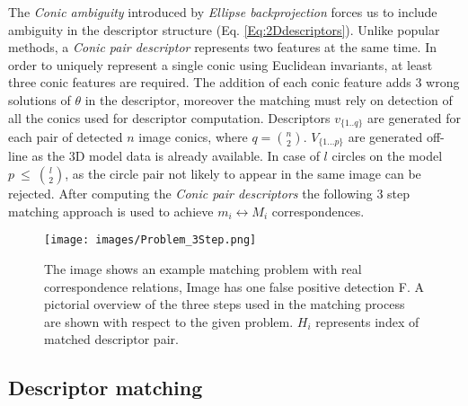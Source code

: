 \documentclass{bmvc2k}
\begin{document}
The \textit{Conic ambiguity} introduced by \textit{Ellipse backprojection} forces us to include ambiguity in the descriptor structure (Eq. \ref{Eq:2Ddescriptors}). 
Unlike popular methods, a \textit{Conic pair descriptor} represents two features at the same time. 
In order to uniquely represent a single conic using Euclidean invariants, at least three conic features are required. 
The addition of each conic feature adds 3 wrong solutions of $ \theta $ in the descriptor, moreover the matching must rely on detection of all the conics used for descriptor computation. 
Descriptors $ v_{\{1..q\}} $ are generated for each pair of detected $ n $ image conics, where $ q = \binom{n}{2} $. 
$ V_{\{1...p\}} $ are generated off-line as the 3D model data is already available.
In case of $ l $ circles on the model $ p~\leq~\binom{l}{2} $, as the circle pair not likely to appear in the same image can be rejected. 
After computing the \textit{Conic pair descriptors} the following 3 step matching approach is used to achieve $ m_i \leftrightarrow M_i $ correspondences. 

\begin{figure}
\centering

\texttt{[image: images/Problem\_3Step.png]}
\caption{ The image shows an example matching problem with real correspondence relations, Image has one false positive detection F. A pictorial overview of the three steps used in the matching process are shown with respect to the given problem. %
$ H_i $ represents index of matched descriptor pair.  
\label{fig:matchingAndProblem}}
\end{figure}

\subsection{Descriptor matching}
\label{ssec:matching}
\end{document}
